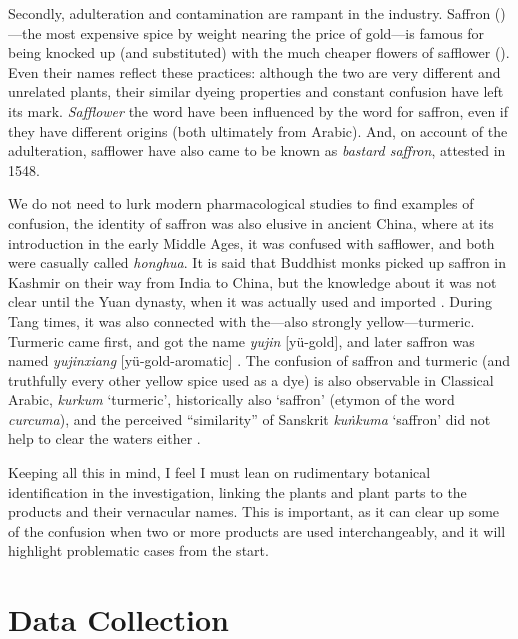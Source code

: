 Secondly, adulteration and contamination are rampant in the industry. Saffron ()---the most expensive spice by weight nearing the price of gold---is famous for being knocked up (and substituted) with the much cheaper flowers of safflower (). Even their names reflect these practices: although the two are very different and unrelated plants, their similar dyeing properties and constant confusion have left its mark. \textit{Safflower} the word have been influenced by the word for saffron, even if they have different origins (both ultimately from Arabic). And, on account of the adulteration, safflower have also came to be known as \textit{bastard saffron}, attested in 1548. 

We do not need to lurk modern pharmacological studies to find examples of confusion, the identity of saffron was also elusive in ancient China, where at its introduction in the early Middle Ages, it was confused with safflower, and both were casually called  \textit{honghua}. It is said that Buddhist monks picked up saffron in Kashmir on their way from India to China, but the knowledge about it was not clear until the Yuan dynasty, when it was actually used and imported \autocite{laufer_sino-iranica_1919}. During Tang times, it was also connected with the---also strongly yellow---turmeric. Turmeric came first, and got the name  \textit{yujin} [yü-gold], and later saffron was named  \textit{yujinxiang} [yü-gold-aromatic] \autocite{schafer_golden_1985}. The confusion of saffron and turmeric (and truthfully every other yellow spice used as a dye) is also observable in Classical Arabic, \textit{kurkum} `turmeric', historically also `saffron' (etymon of the word \textit{curcuma}), and the perceived ``similarity'' of Sanskrit  \textit{kuṅkuma} `saffron' did not help to clear the waters either \autocite[see]{guthrie_trade-language_2009}.

Keeping all this in mind, I feel I must lean on rudimentary botanical identification in the investigation, linking the plants and plant parts to the products and their vernacular names. This is important, as it can clear up some of the confusion when two or more products are used interchangeably, and it will highlight problematic cases from the start.

\section{Data Collection}
\label{sec:data_collection}

